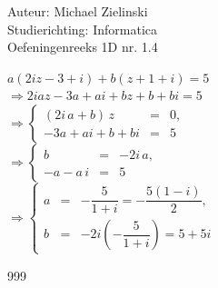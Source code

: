 \documentclass[a4paper]{article}
\begin{document}
  
\noindent \large Auteur: Michael Zielinski \\
\noindent \large Studierichting: Informatica\\
\noindent \large Oefeningenreeks 1D nr. 1.4\\

\medskip

\normalsize

$a\left(2iz - 3 + i\right) + b\left(z + 1 + i\right) = 5$\\


$\Rightarrow 2iaz - 3a + ai + bz + b + bi = 5$\\

$\Rightarrow\left\{
    \begin{array}{lll}
        (2i\,a + b)\,z           & = & 0,\\
        -3a + ai + b + bi        & = & 5
    \end{array}
\right.$\\

$\Rightarrow\left\{
    \begin{array}{lll}
        b                      & = & -2i\,a,\\
        -a - a\,i              & = & 5
    \end{array}
\right.$\\

$\Rightarrow\left\{
    \begin{array}{lll}
        a                      & = & -\dfrac{5}{1+i} = -\dfrac{5(1-i)}{2},\\
        b                      & = & -2i\left(-\dfrac{5}{1+i}\right) = 5 + 5i
    \end{array}
\right.$

\begin{thebibliography}{999}
\end{thebibliography}
\end{document}
